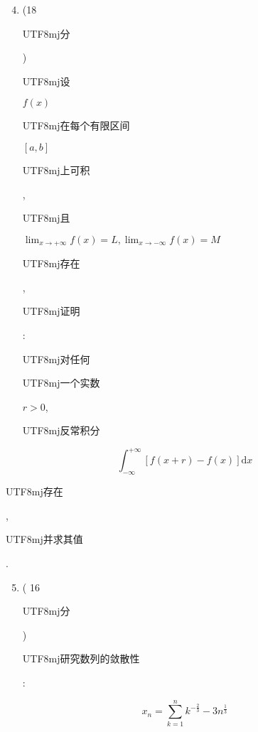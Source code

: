 \documentclass[10pt]{article}
\begin{document}
\begin{enumerate}
  \setcounter{enumi}{3}
  \item (18 \begin{CJK}{UTF8}{mj}分\end{CJK}) \begin{CJK}{UTF8}{mj}设\end{CJK} $f(x)$ \begin{CJK}{UTF8}{mj}在每个有限区间\end{CJK} $[a, b]$ \begin{CJK}{UTF8}{mj}上可积\end{CJK}, \begin{CJK}{UTF8}{mj}且\end{CJK} $\lim _{x \rightarrow+\infty} f(x)=L, \lim _{x \rightarrow-\infty} f(x)=M$ \begin{CJK}{UTF8}{mj}存在\end{CJK}, \begin{CJK}{UTF8}{mj}证明\end{CJK}: \begin{CJK}{UTF8}{mj}对任何\end{CJK} \begin{CJK}{UTF8}{mj}一个实数\end{CJK} $r>0$, \begin{CJK}{UTF8}{mj}反常积分\end{CJK}
\end{enumerate}
$$
\int_{-\infty}^{+\infty}[f(x+r)-f(x)] \mathrm{d} x
$$
\begin{CJK}{UTF8}{mj}存在\end{CJK}, \begin{CJK}{UTF8}{mj}并求其值\end{CJK}.

\begin{enumerate}
  \setcounter{enumi}{4}
  \item ( 16 \begin{CJK}{UTF8}{mj}分\end{CJK}) \begin{CJK}{UTF8}{mj}研究数列的敛散性\end{CJK}:
\end{enumerate}
$$
x_{n}=\sum_{k=1}^{n} k^{-\frac{2}{3}}-3 n^{\frac{1}{3}}
$$
\end{document}
